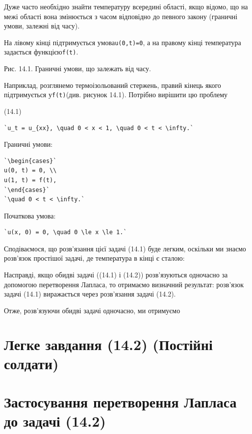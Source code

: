 \documentclass[
  ukrainian,
]{article}
\begin{document}
Дуже часто необхідно знайти температуру всередині області, якщо відомо,
що на межі області вона змінюється з часом відповідно до певного закону
(граничні умови, залежні від часу).

На лівому кінці підтримується умова\texttt{u(0,t)=0}, а на правому кінці
температура задається функцією\texttt{f(t)}.

Рис. 14.1. Граничні умови, що залежать від часу.

Наприклад, розглянемо термоізольований стержень, правий кінець якого
підтримується у\texttt{f(t)}(див. рисунок 14.1). Потрібно вирішити цю
проблему

(14.1)

\begin{verbatim}
`u_t = u_{xx}, \quad 0 < x < 1, \quad 0 < t < \infty.`
\end{verbatim}

Граничні умови:

\begin{verbatim}
`\begin{cases}`
u(0, t) = 0, \\
u(1, t) = f(t),
`\end{cases}`
`\quad 0 < t < \infty.`
\end{verbatim}

Початкова умова:

\begin{verbatim}
`u(x, 0) = 0, \quad 0 \le x \le 1.`
\end{verbatim}

Сподіваємося, що розв'язання цієї задачі (14.1) буде легким, оскільки ми
знаємо розв'язок простішої задачі, де температура в кінці є сталою:

Насправді, якщо обидві задачі ((14.1) і (14.2)) розв'язуються одночасно
за допомогою перетворення Лапласа, то отримаємо визначний результат:
розв'язок задачі (14.1) виражається через розв'язання задачі (14.2).

Отже, розв'язуючи обидві задачі одночасно, ми отримуємо

\section{Легке завдання (14.2) (Постійні
солдати)}\label{ux43bux435ux433ux43aux435-ux437ux430ux432ux434ux430ux43dux43dux44f-14.2-ux43fux43eux441ux442ux456ux439ux43dux456-ux441ux43eux43bux434ux430ux442ux438}

\section{Застосування перетворення Лапласа до задачі
(14.2)}\label{ux437ux430ux441ux442ux43eux441ux443ux432ux430ux43dux43dux44f-ux43fux435ux440ux435ux442ux432ux43eux440ux435ux43dux43dux44f-ux43bux430ux43fux43bux430ux441ux430-ux434ux43e-ux437ux430ux434ux430ux447ux456-14.2}
\end{document}
